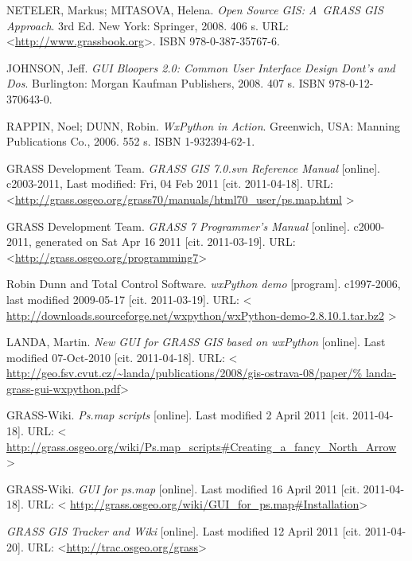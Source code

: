 \documentclass[a4paper,12pt,draft]{article}
\begin{document}
\begin{thebibliography}{99}
\label{literatura}


NETELER, Markus; MITASOVA, Helena. \textit{Open Source GIS:
A~GRASS GIS Approach}. 3rd Ed. New York: Springer, 2008. 406 s. URL:
\textless\url{http://www.grassbook.org}\textgreater. ISBN 978-0-387-35767-6.


JOHNSON, Jeff. \textit{GUI Bloopers 2.0: Common User Interface Design
Dont's and Dos}. Burlington: Morgan Kaufman Publishers, 2008. 407 s. ISBN
978-0-12-370643-0.


RAPPIN, Noel; DUNN, Robin. \emph{WxPython in Action}. Greenwich, USA: Manning
Publications Co., 2006. 552 s. ISBN 1-932394-62-1.


GRASS Development Team. \textit{GRASS GIS 7.0.svn Reference
Manual} [online]. c2003-2011, Last modified: Fri, 04 Feb 2011 [cit.
2011-04-18]. URL:
\textless\url{http://grass.osgeo.org/grass70/manuals/html70_user/ps.map.html}%
\textgreater


GRASS Development Team. \textit{GRASS 7 Programmer's Manual} [online].
c2000-2011, generated on Sat Apr 16 2011 [cit. 2011-03-19].
URL: \textless\url{http://grass.osgeo.org/programming7}\textgreater

Robin Dunn and Total Control Software. \textit{wxPython
demo} [program]. c1997-2006, last modified 2009-05-17 [cit. 2011-03-19]. URL:
\textless
\url{http://downloads.sourceforge.net/wxpython/wxPython-demo-2.8.10.1.tar.bz2}%
\textgreater


LANDA, Martin. \textit{New GUI for GRASS GIS based on wxPython} [online].
Last modified 07-Oct-2010 [cit. 2011-04-18]. URL: \textless
\url{http://geo.fsv.cvut.cz/~landa/publications/2008/gis-ostrava-08/paper/%
landa-grass-gui-wxpython.pdf}\textgreater


GRASS-Wiki. \textit{Ps.map scripts} [online]. Last modified
2 April 2011 [cit. 2011-04-18]. URL: \textless
\url{http://grass.osgeo.org/wiki/Ps.map_scripts\#Creating_a_fancy_North_Arrow}
\textgreater

GRASS-Wiki. \textit{GUI for ps.map} [online]. Last modified
16 April 2011 [cit. 2011-04-18]. URL: \textless
\url{http://grass.osgeo.org/wiki/GUI_for_ps.map\#Installation}\textgreater


\textit{GRASS GIS Tracker and Wiki} [online]. Last modified 12 April 2011
[cit. 2011-04-20].
URL: \textless\url{http://trac.osgeo.org/grass}\textgreater



\end{thebibliography}
\end{document}
